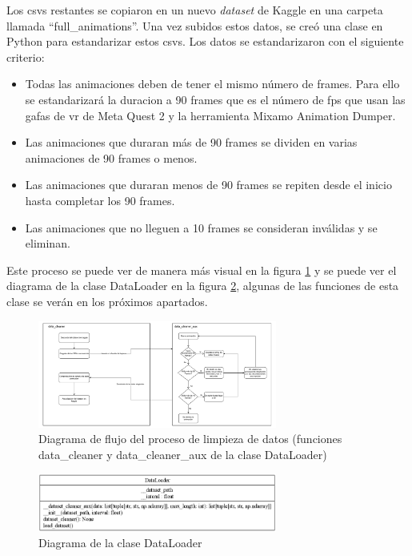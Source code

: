Los \glspl{csv} restantes se copiaron en un nuevo \textit{dataset} de Kaggle en una carpeta llamada ``full\_animations''. Una vez subidos estos datos, se creó una clase en Python para estandarizar estos \glspl{csv}. Los datos se estandarizaron con el siguiente criterio:
\begin{itemize}
    \item Todas las animaciones deben de tener el mismo número de frames. Para ello se estandarizará la duracion a 90 frames que es el número de \gls{fps} que usan las gafas de \gls{vr} de Meta Quest 2 y la herramienta Mixamo Animation Dumper.
    \item Las animaciones que duraran más de 90 frames se dividen en varias animaciones de 90 frames o menos.
    \item Las animaciones que duraran menos de 90 frames se repiten desde el inicio hasta completar los 90 frames.
    \item Las animaciones que no lleguen a 10 frames se consideran inválidas y se eliminan.
\end{itemize}

Este proceso se puede ver de manera más visual en la figura \ref{fig:data_cleaner} y se puede ver el diagrama de la clase DataLoader en la figura \ref{fig:data_loader}, algunas de las funciones de esta clase se verán en los próximos apartados.

\begin{figure}[H]
    \centering
    \includegraphics[width=0.7\textwidth]{Imagenes/Vectorial/data_cleaner.pdf}
    \caption{Diagrama de flujo del proceso de limpieza de datos (funciones data\_cleaner y data\_cleaner\_aux de la clase DataLoader)}
    \label{fig:data_cleaner}
\end{figure}

\begin{figure}[H]
    \centering
    \includegraphics[width=0.7\textwidth]{Imagenes/Bitmap/DataLoader_UML.png}
    \caption{Diagrama de la clase DataLoader}
    \label{fig:data_loader}
\end{figure}
